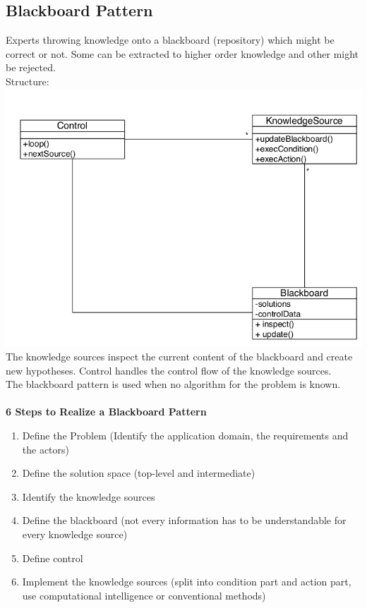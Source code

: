 \subsection{Blackboard Pattern}
Experts throwing knowledge onto a blackboard (repository) which might be correct or not. Some can be extracted to higher order knowledge and other might be rejected.\\
Structure:\\
\includegraphics[width=\linewidth]{images/pattern_blackboard.png}
The knowledge sources inspect the current content of the blackboard and create new hypotheses.
Control handles the control flow of the knowledge sources.\\
The blackboard pattern is used when no algorithm for the problem is known.\\
\\
\textbf{6 Steps to Realize a Blackboard Pattern}
\begin{enumerate}
  \item Define the Problem (Identify the application domain, the requirements and the actors)
  \item Define the solution space (top-level and intermediate)
  \item Identify the knowledge sources
  \item Define the blackboard (not every information has to be understandable for every knowledge source)
  \item Define control
  \item Implement the knowledge sources (split into condition part and action part, use computational intelligence or conventional methods)
\end{enumerate}
\newpage

